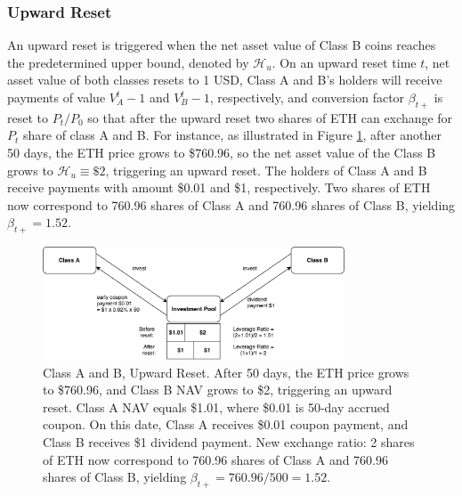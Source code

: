 \documentclass[draft, noinfoline]{ectaart}
\numberwithin{equation}{section}
\theoremstyle{plain}
\begin{document}
\subsubsection{Upward Reset}
An upward reset is triggered when the net asset value of Class B coins reaches the predetermined upper bound, denoted by $\mathcal{H}_{u}$. On an upward reset time $t$, net asset value of both classes resets to 1 USD, Class A and B's holders will receive payments of value $V_{A}^{t}-1$ and $V_{B}^{t}-1$, respectively, and conversion factor $\beta_{t+}$ is reset to $P_t/P_0$ so that after the upward reset two shares of ETH can exchange for $P_t$ share of class A and B. For instance, as illustrated in Figure \ref{fig:upward}, after another 50 days, the ETH price grows to \$760.96, so the net asset value of the Class B grows to $\mathcal{H}_{u}\equiv \$2$, triggering an upward reset. The holders of Class A and B receive payments with amount \$0.01 and \$1, respectively. Two shares of ETH now correspond to 760.96 shares of Class A and 760.96 shares of Class B, yielding $\beta_{t+}=1.52$.

\begin{figure}[!htb]
	\centering
	\includegraphics[width=0.8\textwidth]{upward}
	\caption{Class A and B, Upward Reset. After 50 days, the ETH price grows to \$760.96, and Class B NAV grows to \$2, triggering an upward reset. Class A NAV equals \$1.01, where \$0.01 is 50-day accrued coupon. On this date, Class A receives \$0.01 coupon payment, and Class B receives \$1 dividend payment. New exchange ratio: 2 shares of ETH now correspond to 760.96 shares of Class A and 760.96 shares of Class B, yielding $\beta_{t+}=760.96/500=1.52$. }\label{fig:upward}
\end{figure}
\end{document}
